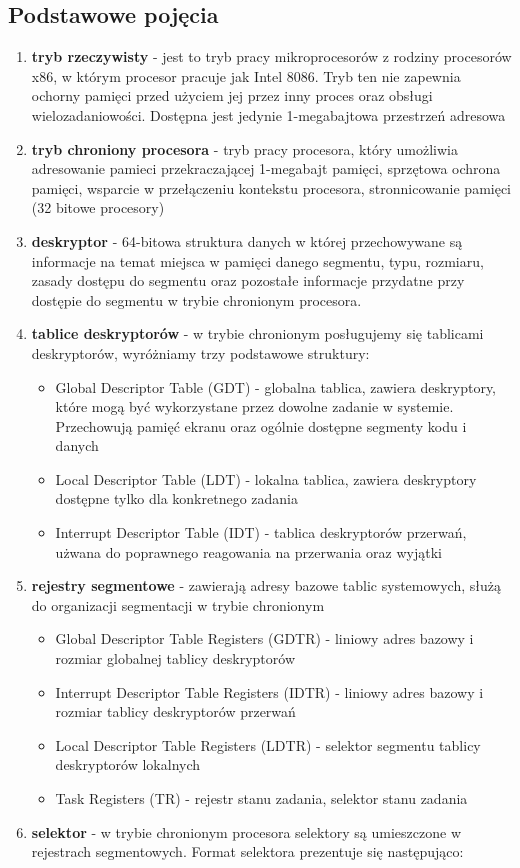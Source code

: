 \documentclass[a4paper,12pt]{article}
\begin{document}
	\subsection{Podstawowe pojęcia}
\begin{enumerate}
				\item{\textbf{tryb rzeczywisty} - jest to tryb pracy mikroprocesorów z rodziny procesorów x86, w którym procesor pracuje jak Intel 8086. Tryb ten nie zapewnia ochorny pamięci przed użyciem jej przez inny proces oraz obsługi wielozadaniowości. Dostępna jest jedynie 1-megabajtowa przestrzeń adresowa}

				\item{\textbf{tryb chroniony procesora} - tryb pracy procesora, który umożliwia adresowanie pamieci przekraczającej 1-megabajt pamięci, sprzętowa ochrona pamięci, wsparcie w przełączeniu kontekstu procesora, stronnicowanie pamięci (32 bitowe procesory) }

				\item{\textbf{deskryptor} - 64-bitowa struktura danych w której przechowywane są informacje na temat miejsca w pamięci danego segmentu, typu, rozmiaru, zasady dostępu do segmentu oraz pozostałe informacje przydatne przy dostępie do segmentu w trybie chronionym procesora. }

				\item{\textbf{tablice deskryptorów} - w trybie chronionym posługujemy się tablicami deskryptorów, wyróżniamy trzy podstawowe struktury: }
\begin{itemize}
						\item{Global Descriptor Table (GDT) - globalna tablica, zawiera deskryptory, które mogą być wykorzystane przez dowolne zadanie w systemie. Przechowują pamięć ekranu oraz ogólnie dostępne segmenty kodu i danych}
						\item{Local Descriptor Table (LDT) - lokalna tablica, zawiera deskryptory dostępne tylko dla konkretnego zadania}
						\item{Interrupt Descriptor Table (IDT) - tablica deskryptorów przerwań, użwana do poprawnego reagowania na przerwania oraz wyjątki}
					\end{itemize}

\item{\textbf{rejestry segmentowe} - zawierają adresy bazowe tablic systemowych, służą do organizacji segmentacji w trybie chronionym}
\begin{itemize}
\item{Global Descriptor Table Registers (GDTR) - liniowy adres bazowy i rozmiar globalnej tablicy deskryptorów}
\item{Interrupt Descriptor Table Registers (IDTR) - liniowy adres bazowy i rozmiar tablicy deskryptorów przerwań}
\item{Local Descriptor Table Registers (LDTR) - selektor segmentu tablicy deskryptorów lokalnych}
\item{Task Registers (TR) - rejestr stanu zadania, selektor stanu zadania}
\end{itemize}
				\item{\textbf{selektor} - w trybie chronionym procesora selektory są umieszczone w rejestrach segmentowych. Format selektora prezentuje się następująco:}


\end{enumerate}
\end{document}
